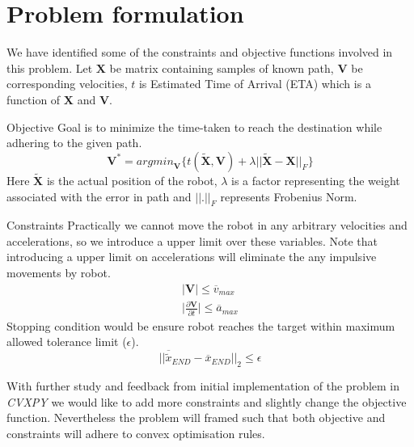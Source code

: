 \documentclass[10pt,twocolumn,letterpaper]{article}
\begin{document}
\section{Problem formulation}
We have identified some of the constraints and objective functions involved in this problem. 
Let $\mathbf{X}$ be matrix containing samples of known path, $\mathbf{V}$ be corresponding velocities, $t$ is Estimated Time of Arrival (ETA) which is a function of $\mathbf{X}$ and $\mathbf{V}$.

\begin{subsection}{Objective}
Goal is to minimize the time-taken to reach the destination while adhering to the given path.
\begin{equation} \label{eq:obj}
    \mathbf{V}^* = {argmin}_{\mathbf{V}} \{t(\tilde{\mathbf{X}}, \mathbf{V}) + \lambda||\tilde{\mathbf{X}} - \mathbf{X}||_F   \} 
\end{equation}
Here $\tilde{\mathbf{X}}$ is the actual position of the robot, $\lambda$ is a factor representing the weight associated with the error in path and $||.||_F$ represents Frobenius Norm.
\end{subsection}

\begin{subsection}{Constraints}
Practically we cannot move the robot in any arbitrary velocities and accelerations, so we introduce a upper limit over these variables. Note that introducing a upper limit on accelerations will eliminate the any impulsive movements by robot.
\begin{gather}
    |\mathbf{V}| \le \overline{v}_{max}\\
    \Bigg|\frac{\partial \mathbf{V}}{\partial t}\Bigg| \le \overline{a}_{max}
\end{gather}
Stopping condition would be ensure robot reaches the target within maximum allowed tolerance limit ($\epsilon$). 
\begin{equation}
    ||\overline{\tilde{x}}_{END} -\overline{x}_{END}||_2  \le \epsilon
\end{equation}
\end{subsection}
With further study and feedback from initial implementation of the problem in \textit{CVXPY} we would like to add more constraints and slightly change the objective function. Nevertheless the problem will framed such that both objective and constraints will adhere to convex optimisation rules.
{\small


}
\end{document}
